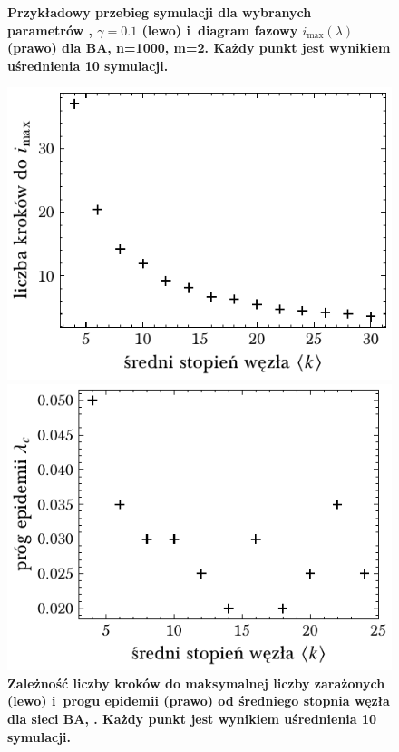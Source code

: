 \documentclass[13pt,a4paper]{article}
\begin{document}
\begin{figure}[ht!]
\begin{minipage}[t]{0.49\textwidth}
	\end{minipage}
	\caption{\centering\textbf{Przykładowy przebieg symulacji dla wybranych parametrów , $\gamma=0.1$ (lewo) i diagram fazowy $i_{\max}(\lambda)$ (prawo) dla BA, n=1000, m=2. Każdy punkt jest wynikiem uśrednienia 10 symulacji.}}
\end{figure}

\begin{figure}[ht!]
	\begin{minipage}[t]{0.49\textwidth}
		\centering
		\includegraphics[width=\textwidth]{../figures/gamma/ba_tmax_vs_k.pdf}
	\end{minipage}
	\hspace{\fill}
	\begin{minipage}[t]{0.49\textwidth}
		\centering
		\includegraphics[width=\textwidth]{../figures/gamma/ba_threshold_vs_k.pdf}
	\end{minipage}
	\caption{\centering\textbf{Zależność liczby kroków do maksymalnej liczby zarażonych (lewo) i progu epidemii (prawo) od średniego stopnia węzła dla sieci BA, . Każdy punkt jest wynikiem uśrednienia 10 symulacji.}}
\end{figure}
\pagebreak
\end{document}
